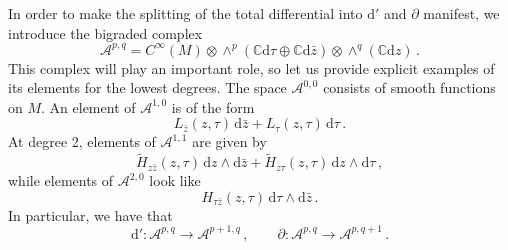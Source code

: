 \documentclass[11pt]{amsart}
\newcommand{\C}{{\mathbb C}}
\numberwithin{equation}{section}
\numberwithin{figure}{section}
\numberwithin{table}{section}
\renewcommand{\d}{\mathrm{d}}
\newcommand{\cA}{\mathcal{A}}
\theoremstyle{thm}
\numberwithin{equation}{subsection}
\theoremstyle{definition}
\theoremstyle{rem}
\begin{document}
In order to make the splitting of the total differential into $\d'$ and $\partial$ manifest, we introduce the bigraded complex 
\begin{equation}
    \mathcal{A}^{p,q}= C^{\infty}(M)\otimes \wedge^p (\C \d \tau \oplus \C \d \bar z)\otimes \wedge^q (\C \d z) \,.
\end{equation}
This complex will play an important role, so let us provide explicit examples of its elements for the lowest degrees. The space \(\mathcal{A}^{0,0}\) consists of smooth functions on $M$. An element of \(\mathcal{A}^{1,0}\) is of the form
\begin{equation}
    L_{\bar z}(z,\tau)\, \mathrm{d}\bar z + L_{\tau}(z,\tau)\, \mathrm{d}\tau\,.
\end{equation}
At degree 2, elements of \(\mathcal{A}^{1,1}\) are given by
\begin{equation}
    \tilde{H}_{z\bar z}(z,\tau)\, \mathrm{d}z \wedge \mathrm{d}\bar z + \tilde{H}_{z\tau}(z,\tau)\, \mathrm{d}z \wedge \mathrm{d}\tau\,,
\end{equation}
while elements of \(\mathcal{A}^{2,0}\) look like
\begin{equation}
    H_{\tau \bar z}(z,\tau)\, \mathrm{d}\tau \wedge \mathrm{d}\bar z\,.
\end{equation}
In particular, we have that
\begin{equation}
    \d':\cA^{p,q} \to \cA^{p+1,q} \,,\qquad \partial:\cA^{p,q} \to \cA^{p,q+1} \,.
\end{equation}

\medskip
\end{document}
